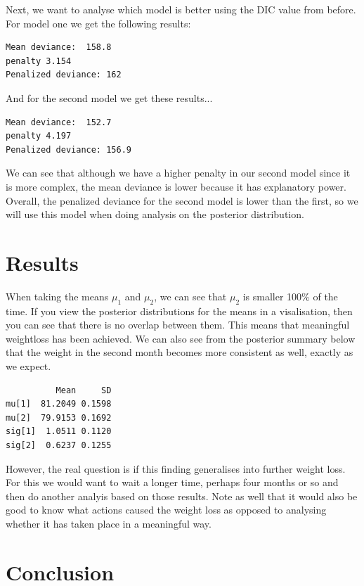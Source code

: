 \documentclass[journal, a4paper]{IEEEtran}
\begin{document}
Next, we want to analyse which model is better using the DIC value from before. For model one we get the following results:

\begin{verbatim}
Mean deviance:  158.8 
penalty 3.154 
Penalized deviance: 162 
\end{verbatim}

And for the second model we get these results...

\begin{verbatim}
Mean deviance:  152.7 
penalty 4.197 
Penalized deviance: 156.9
\end{verbatim}

We can see that although we have a higher penalty in our second model since it is more complex, the mean deviance is lower because it has explanatory power.
Overall, the penalized deviance for the second model is lower than the first, so we will use this model when doing analysis on the posterior distribution.

\section{Results}

When taking the means $\mu_1$ and $\mu_2$, we can see that $\mu_2$ is smaller 100\% of the time. If you view the posterior distributions for the means in a
visalisation, then you can see that there is no overlap between them. This means that meaningful weightloss has been achieved. We can also see from the 
posterior summary below that the weight in the second month becomes more consistent as well, exactly as we expect.

\begin{verbatim}
          Mean     SD
mu[1]  81.2049 0.1598
mu[2]  79.9153 0.1692
sig[1]  1.0511 0.1120
sig[2]  0.6237 0.1255
\end{verbatim}

However, the real question is if this finding generalises into further weight loss. For this we would want to wait a longer time, perhaps four months or so and
then do another analyis based on those results. Note as well that it would also be good to know what actions caused the weight loss as opposed to analysing 
whether it has taken place in a meaningful way.

\section{Conclusion}
\end{document}
